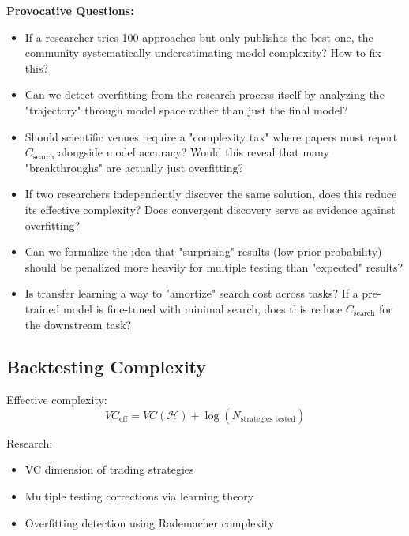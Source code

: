   \textbf{Provocative Questions:}
  \begin{itemize}
    \item If a researcher tries 100 approaches but only publishes the best
      one, the community systematically underestimating model complexity?
      How to fix this?

    \item Can we detect overfitting from the research process itself by analyzing
      the "trajectory" through model space rather than just the final model?

    \item Should scientific venues require a "complexity tax" where papers
      must report $C_{\text{search}}$ alongside model accuracy? Would
      this reveal that many "breakthroughs" are actually just
      overfitting?

    \item If two researchers independently discover the same solution,
      does this reduce its effective complexity? Does convergent discovery
      serve as evidence against overfitting?

    \item Can we formalize the idea that "surprising" results (low prior
      probability) should be penalized more heavily for multiple testing
      than "expected" results?

    \item Is transfer learning a way to "amortize" search cost across tasks?
      If a pre-trained model is fine-tuned with minimal search, does this
      reduce $C_{\text{search}}$ for the downstream task?
  \end{itemize}

  \subsection*{Backtesting Complexity}

  Effective complexity:
  $$
    VC_{\text{eff}}= VC(\mathcal{H}) + \log(N_{\text{strategies tested}})
  $$

  Research:
  \begin{itemize}
    \item VC dimension of trading strategies

    \item Multiple testing corrections via learning theory

    \item Overfitting detection using Rademacher complexity
  \end{itemize}

